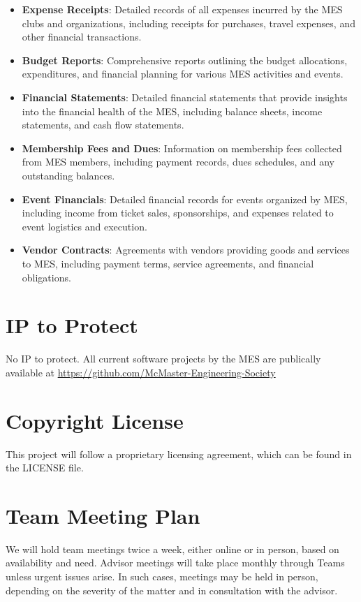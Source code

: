 \documentclass{article}
\begin{document}
\begin{itemize}
  \item \textbf{Expense Receipts}: Detailed records of all expenses incurred by the MES clubs and organizations, including receipts for purchases, travel expenses, and other financial transactions.
  \item \textbf{Budget Reports}: Comprehensive reports outlining the budget allocations, expenditures, and financial planning for various MES activities and events.
  \item \textbf{Financial Statements}: Detailed financial statements that provide insights into the financial health of the MES, including balance sheets, income statements, and cash flow statements.
  \item \textbf{Membership Fees and Dues}: Information on membership fees collected from MES members, including payment records, dues schedules, and any outstanding balances.
  \item \textbf{Event Financials}: Detailed financial records for events organized by MES, including income from ticket sales, sponsorships, and expenses related to event logistics and execution.
  \item \textbf{Vendor Contracts}: Agreements with vendors providing goods and services to MES, including payment terms, service agreements, and financial obligations.
\end{itemize}


\section{IP to Protect}
No IP to protect. All current software projects by the MES are publically available at \href{https://github.com/McMaster-Engineering-Society}{https://github.com/McMaster-Engineering-Society}


\section{Copyright License}
This project will follow a proprietary licensing agreement, which can be found in the LICENSE file.

\section{Team Meeting Plan}

We will hold team meetings twice a week, either online or in person, based on availability and need. Advisor meetings will take place monthly through Teams unless urgent issues arise. In such cases, meetings may be held in person, depending on the severity of the matter and in consultation with the advisor.
\end{document}
